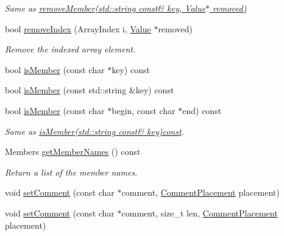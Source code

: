 \begin{DoxyCompactItemize}
\begin{DoxyCompactList}\small\item\em Same as \hyperlink{class_json_1_1_value_a3749dae413a73eac05b7f8dc6deeb6a2}{remove\+Member(std\+::string const\& key, Value$\ast$ removed)} \end{DoxyCompactList}\item 
bool \hyperlink{class_json_1_1_value_ae9e67e08a85a2f3be3396ec0f4c47f65}{remove\+Index} (Array\+Index i, \hyperlink{class_json_1_1_value}{Value} $\ast$removed)
\begin{DoxyCompactList}\small\item\em Remove the indexed array element. \end{DoxyCompactList}\item 
bool \hyperlink{class_json_1_1_value_a196defba501d70ea2b6793afb04108e3}{is\+Member} (const char $\ast$key) const 
\item 
bool \hyperlink{class_json_1_1_value_af728b5738aaa133f3aad2e39dc4f415e}{is\+Member} (const std\+::string \&key) const 
\item 
\hypertarget{class_json_1_1_value_a077604b87a79d75543a1b5438eb9d8ab}{}bool \hyperlink{class_json_1_1_value_a077604b87a79d75543a1b5438eb9d8ab}{is\+Member} (const char $\ast$begin, const char $\ast$end) const \label{class_json_1_1_value_a077604b87a79d75543a1b5438eb9d8ab}

\begin{DoxyCompactList}\small\item\em Same as \hyperlink{class_json_1_1_value_af728b5738aaa133f3aad2e39dc4f415e}{is\+Member(std\+::string const\& key)const}. \end{DoxyCompactList}\item 
Members \hyperlink{class_json_1_1_value_a30fa08af88f2d0a038b22ba9f4e88b2a}{get\+Member\+Names} () const 
\begin{DoxyCompactList}\small\item\em Return a list of the member names. \end{DoxyCompactList}\item 
void \hyperlink{class_json_1_1_value_a29f3a30f7e5d3af6f38d57999bf5b480}{set\+Comment} (const char $\ast$comment, \hyperlink{namespace_json_a4fc417c23905b2ae9e2c47d197a45351}{Comment\+Placement} placement)
\item 
\hypertarget{class_json_1_1_value_a2900152a2887b410a9ddabe278b9d492}{}void \hyperlink{class_json_1_1_value_a2900152a2887b410a9ddabe278b9d492}{set\+Comment} (const char $\ast$comment, size\+\_\+t len, \hyperlink{namespace_json_a4fc417c23905b2ae9e2c47d197a45351}{Comment\+Placement} placement)\label{class_json_1_1_value_a2900152a2887b410a9ddabe278b9d492}


\end{DoxyCompactItemize}
